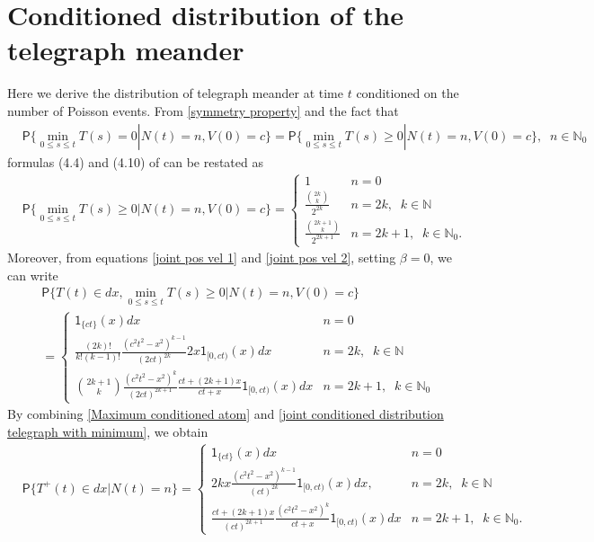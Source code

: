 \documentclass{article}
\theoremstyle{definition}
\numberwithin{equation}{section}
\begin{document}
\section{Conditioned distribution of the telegraph meander}
Here we derive the distribution of telegraph meander at time $t$ conditioned on the number of Poisson events. From \eqref{symmetry property} and the fact that
\begin{align*}
&\mathsf{P}\{\min_{0\leq s\leq t}T(s) = 0|N(t) = n,V(0) = c\} = \mathsf{P}\{\min_{0\leq s\leq t}T(s) \geq 0|N(t) = n,V(0) = c\}, \;\; n\in \mathbb{N}_0
\end{align*}
formulas (4.4) and (4.10) of \cite{CO 2021} can be restated as
\begin{align}\label{Maximum conditioned atom}
&\mathsf{P}\{\min_{0\leq s\leq t}T(s)\geq 0|N(t) = n,V(0) = c\} = 
\begin{cases}
1 &n=0\\
\frac{\binom{2k}{k}}{2^{2k}} &n = 2k,\;\; k \in \mathbb{N}\\
\frac{\binom{2k+1}{k}}{2^{2k+1}} &n = 2k+1,\;\; k \in \mathbb{N}_0.
\end{cases}
\end{align}
Moreover, from equations \eqref{joint pos vel 1} and \eqref{joint pos vel 2}, setting $\beta = 0$, we can write
\begin{align}\label{joint conditioned distribution telegraph with minimum}
&\mathsf{P}\{T(t) \in dx,\min_{0\leq s\leq t}T(s)\geq 0|N(t) = n,V(0) = c\} \nonumber \\
&=\begin{cases}
\mathsf{1}_{\{ct\}}(x)dx &n=0\\
\frac{(2k)!}{k!(k-1)!}\frac{(c^2t^2-x^2)^{k-1}}{(2ct)^{2k}}2x\mathsf{1}_{[0,ct)}(x)dx &n = 2k, \;\;k \in \mathbb{N}\\
\binom{2k+1}{k}\frac{(c^2t^2-x^2)^{k}}{(2ct)^{2k+1}}\frac{ct+(2k+1)x}{ct+x}\mathsf{1}_{[0,ct)}(x)dx &n = 2k+1, \;\;k \in \mathbb{N}_0
\end{cases}
\end{align}
By combining \eqref{Maximum conditioned atom} and \eqref{joint conditioned distribution telegraph with minimum}, we obtain
\begin{align}\label{Telegraph meander conditioned 1}
&\mathsf{P}\{T^+(t) \in dx|N(t) = n\} 
=\begin{cases}
\mathsf{1}_{\{ct\}}(x)dx &n=0\\
2kx\frac{(c^2t^2-x^2)^{k-1}}{(ct)^{2k}}\mathsf{1}_{[0,ct)}(x)dx, &n = 2k,\;\; k \in \mathbb{N}\\
\frac{ct+(2k+1)x}{(ct)^{2k+1}}\frac{(c^2t^2-x^2)^{k}}{ct+x}\mathsf{1}_{[0,ct)}(x)dx &n=2k+1,\;\; k \in \mathbb{N}_0. 
\end{cases}
\end{align}
\end{document}
